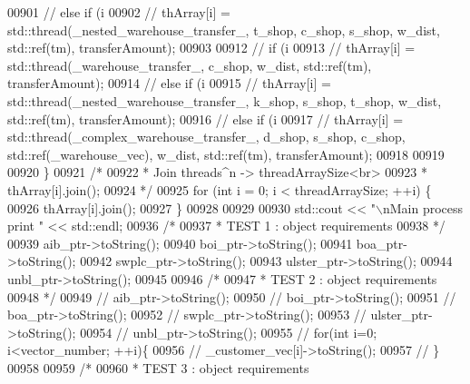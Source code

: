 \begin{DoxyCode}
{{{{{{{{00901         \textcolor{comment}{//        else if (i %
00902         \textcolor{comment}{//            thArray[i] = std::thread(\_nested\_warehouse\_transfer\_, t\_shop, c\_shop, s\_shop, w\_dist,
       std::ref(tm), transferAmount);}
00903 
00912         \textcolor{comment}{//        if (i %
00913         \textcolor{comment}{//            thArray[i] = std::thread(\_warehouse\_transfer\_, c\_shop, w\_dist, std::ref(tm),
       transferAmount);}
00914         \textcolor{comment}{//        else if (i %
00915         \textcolor{comment}{//            thArray[i] = std::thread(\_nested\_warehouse\_transfer\_, k\_shop, s\_shop, t\_shop, w\_dist,
       std::ref(tm), transferAmount);}
00916         \textcolor{comment}{//        else if (i %
00917         \textcolor{comment}{//            thArray[i] = std::thread(\_complex\_warehouse\_transfer\_, d\_shop, s\_shop, c\_shop,
       std::ref(\_warehouse\_vec), w\_dist, std::ref(tm), transferAmount);}
00918 
00919 
00920     \}
00921     \textcolor{comment}{/*}
00922 \textcolor{comment}{     * Join threads^n -> threadArraySize<br>}
00923 \textcolor{comment}{     * thArray[i].join();}
00924 \textcolor{comment}{     */}
00925     \textcolor{keywordflow}{for} (\textcolor{keywordtype}{int} i = 0; i < threadArraySize; ++i) \{
00926         thArray[i].join();
00927     \}
00928 
00929 
00930     std::cout << \textcolor{stringliteral}{"\(\backslash\)nMain process print "} << std::endl;
00936     \textcolor{comment}{/*}
00937 \textcolor{comment}{     * TEST 1 : object requirements}
00938 \textcolor{comment}{     */}
00939     aib\_ptr->toString();
00940     boi\_ptr->toString();
00941     boa\_ptr->toString();
00942     swplc\_ptr->toString();
00943     ulster\_ptr->toString();
00944     unbl\_ptr->toString();
00945 
00946     \textcolor{comment}{/*}
00947 \textcolor{comment}{     * TEST 2 : object requirements }
00948 \textcolor{comment}{     */}
00949     \textcolor{comment}{//    aib\_ptr->toString();}
00950     \textcolor{comment}{//    boi\_ptr->toString();}
00951     \textcolor{comment}{//    boa\_ptr->toString();}
00952     \textcolor{comment}{//    swplc\_ptr->toString();}
00953     \textcolor{comment}{//    ulster\_ptr->toString();}
00954     \textcolor{comment}{//    unbl\_ptr->toString();}
00955     \textcolor{comment}{//    for(int i=0; i<vector\_number; ++i)\{}
00956     \textcolor{comment}{//        \_customer\_vec[i]->toString();}
00957     \textcolor{comment}{//    \}}
00958 
00959     \textcolor{comment}{/*}
00960 \textcolor{comment}{     * TEST 3 : object requirements}
}}}}}}}}}}}}
\end{DoxyCode}
